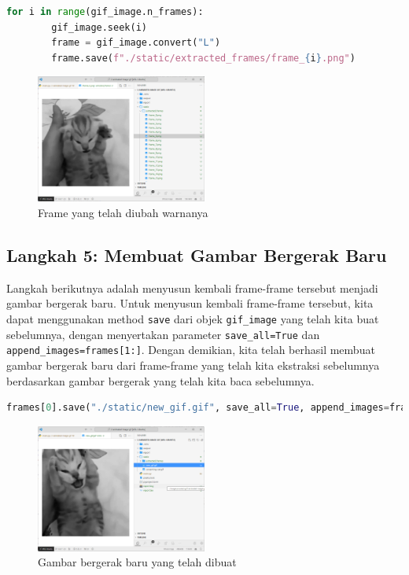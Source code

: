 \documentclass{assignment}
\newcommand\tab[1][0.5cm]{\hspace*{#1}}
\begin{document}
\begin{lstlisting}[language=Python ,style=code]
    for i in range(gif_image.n_frames):
        gif_image.seek(i)
        frame = gif_image.convert("L")
        frame.save(f"./static/extracted_frames/frame_{i}.png")
\end{lstlisting}

\begin{figure}[H]
    \centering
    \includegraphics[width=0.5\textwidth]{./static/capture2.png}
    \caption{Frame yang telah diubah warnanya}
    \label{fig:gambar2}
\end{figure}

\subsection*{Langkah 5: Membuat Gambar Bergerak Baru}
\tab Langkah berikutnya adalah menyusun kembali frame-frame tersebut menjadi gambar bergerak baru. Untuk menyusun kembali frame-frame tersebut, kita dapat menggunakan method \texttt{save} dari objek \texttt{gif\_image} yang telah kita buat sebelumnya, dengan menyertakan parameter \texttt{save\_all=True} dan \texttt{append\_images=frames[1:]}. Dengan demikian, kita telah berhasil membuat gambar bergerak baru dari frame-frame yang telah kita ekstraksi sebelumnya berdasarkan gambar bergerak yang telah kita baca sebelumnya.

\begin{lstlisting}[language=Python ,style=code]
    frames[0].save("./static/new_gif.gif", save_all=True, append_images=frames[1:], loop=0, duration=gif_image.info["duration"])
\end{lstlisting}
\begin{figure}[H]
    \centering
    \includegraphics[width=0.5\textwidth]{./static/capture3.png}
    \caption{Gambar bergerak baru yang telah dibuat}
    \label{fig:gambar3}
\end{figure}
\end{document}
